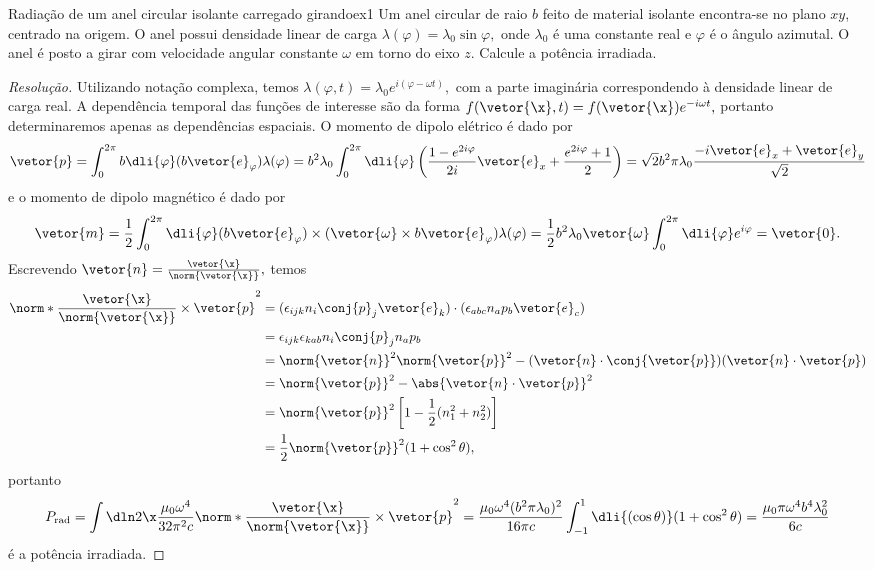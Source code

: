 \begin{exercício}{Radiação de um anel circular isolante carregado girando}{ex1}
    Um anel circular de raio \(b\) feito de material isolante encontra-se no plano \(xy\), centrado na origem. O anel possui densidade linear de carga \(\lambda(\varphi) = \lambda_0 \sin \varphi,\) onde \(\lambda_0\) é uma constante real e \(\varphi\) é o ângulo azimutal. O anel é posto a girar com velocidade angular constante \(\omega\) em torno do eixo \(z.\) Calcule a potência irradiada.
\end{exercício}
\begin{proof}[Resolução]
    Utilizando notação complexa, temos \(\lambda(\varphi, t) = \lambda_0 e^{i(\varphi - \omega t)},\) com a parte imaginária correspondendo à densidade linear de carga real. A dependência temporal das funções de interesse são da forma \(f(\vetor{\x}, t) = f(\vetor{\x}) e^{-i\omega t},\) portanto determinaremos apenas as dependências espaciais. O momento de dipolo elétrico é dado por
    \begin{equation*}
        \vetor{p} = \int_{0}^{2\pi} b \dli{\varphi} (b \vetor{e}_\varphi) \lambda(\varphi) = b^2 \lambda_0 \int_0^{2\pi} \dli{\varphi} \left(\frac{1 - e^{2i \varphi}}{2i}\vetor{e}_x + \frac{e^{2i\varphi} + 1}{2}\right) = \sqrt{2}b^2 \pi \lambda_0 \frac{-i\vetor{e}_x + \vetor{e}_y}{\sqrt{2}}
    \end{equation*}
    e o momento de dipolo magnético é dado por
    \begin{equation*}
        \vetor{m} = \frac12 \int_0^{2\pi} \dli{\varphi} (b\vetor{e}_\varphi) \times (\vetor{\omega} \times b \vetor{e}_\varphi) \lambda(\varphi) = \frac12 b^2\lambda_0\vetor{\omega} \int_0^{2\pi} \dli{\varphi}e^{i\varphi} = \vetor{0}.
    \end{equation*}
    Escrevendo \(\vetor{n} = \frac{\vetor{\x}}{\norm{\vetor{\x}}},\) temos
    \begin{align*}
        \norm*{\frac{\vetor{\x}}{\norm{\vetor{\x}}} \times \vetor{p}}^2 
        &= (\epsilon_{ijk} n_i \conj{p}_j \vetor{e}_k) \cdot (\epsilon_{abc} n_a p_b \vetor{e}_c)\\
        &= \epsilon_{ijk}\epsilon_{kab} n_i \conj{p}_j n_a p_b\\
        &= \norm{\vetor{n}}^2 \norm{\vetor{p}}^2 - (\vetor{n} \cdot \conj{\vetor{p}}) (\vetor{n} \cdot \vetor{p})\\
        &= \norm{\vetor{p}}^2 - \abs{\vetor{n} \cdot \vetor{p}}^2\\
        &= \norm{\vetor{p}}^2\left[1 - \frac12(n_1^2 + n_2^2)\right]\\
        &= \frac12\norm{\vetor{p}}^2 (1 + \cos^2\theta),
    \end{align*}
    portanto
    \begin{equation*}
        P_{\mathrm{rad}} = \int\dln2\x \frac{\mu_0 \omega^4}{32 \pi^2 c} \norm*{\frac{\vetor{\x}}{\norm{\vetor{\x}}} \times \vetor{p}}^2 = \frac{\mu_0 \omega^4(b^2 \pi \lambda_0)^2}{16\pi c} \int_{-1}^{1} \dli{(\cos\theta)} (1+\cos^2\theta) = \frac{\mu_0 \pi \omega^4 b^4 \lambda_0^2}{6 c}
    \end{equation*}
    é a potência irradiada.
\end{proof}
